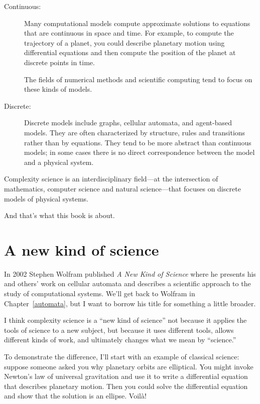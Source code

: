 \documentclass[10pt]{book}
\begin{document}
\begin{description}

\item[Continuous:] Many computational models compute approximate
  solutions to equations that are continuous in space and time.  For
  example, to compute the trajectory of a planet, you could describe
  planetary motion using differential equations and then compute the
  position of the planet at discrete points in time.

The fields of numerical methods and scientific computing
tend to focus on these kinds of models.

\item[Discrete:] Discrete models include graphs, cellular automata,
  and agent-based models.  They are often characterized by structure,
  rules and transitions rather than by equations.  They tend to be
  more abstract than continuous models; in some cases there is no
  direct correspondence between the model and a physical system.

\end{description}

Complexity science is an interdisciplinary field---at the intersection
of mathematics, computer science and natural science---that focuses on
discrete models of physical systems.

And that's what this book is about.


\section{A new kind of science}

In 2002 Stephen Wolfram published {\em A New Kind of Science} where he
presents his and others' work on cellular automata and describes a
scientific approach to the study of computational systems.  We'll get
back to Wolfram in Chapter~\ref{automata}, but I want to borrow his
title for something a little broader.

I think complexity science is a ``new kind of science'' not because
it applies the tools of science to a new subject, but because it
uses different tools, allows different kinds of work, and ultimately
changes what we mean by ``science.''

To demonstrate the difference, I'll start with an example of classical
science: suppose someone asked you why planetary orbits are
elliptical.  You might invoke Newton's law of universal
gravitation and use it to write a differential equation that describes
planetary motion.  Then you could solve the differential equation and
show that the solution is an ellipse.  Voil\`{a}!
\end{document}
